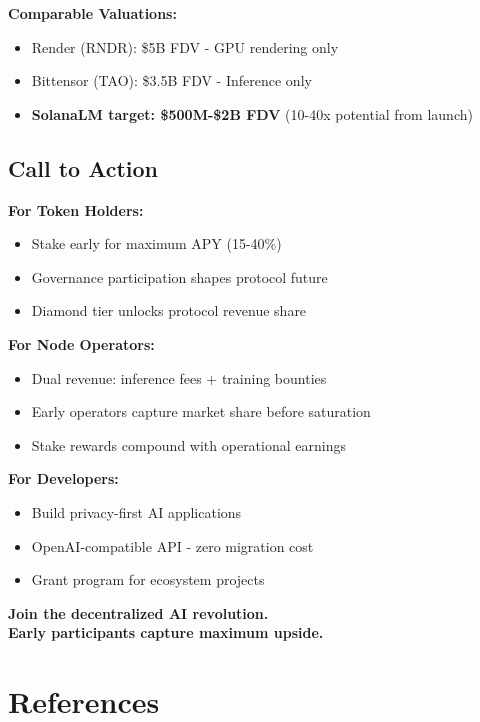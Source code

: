 \documentclass[11pt,a4paper]{article}
\begin{document}
\textbf{Comparable Valuations:}
\begin{itemize}
    \item Render (RNDR): \$5B FDV - GPU rendering only
    \item Bittensor (TAO): \$3.5B FDV - Inference only
    \item \textbf{SolanaLM target: \$500M-\$2B FDV} (10-40x potential from launch)
\end{itemize}

\subsection{Call to Action}

\textbf{For Token Holders:}
\begin{itemize}
    \item Stake early for maximum APY (15-40\%)
    \item Governance participation shapes protocol future
    \item Diamond tier unlocks protocol revenue share
\end{itemize}

\textbf{For Node Operators:}
\begin{itemize}
    \item Dual revenue: inference fees + training bounties
    \item Early operators capture market share before saturation
    \item Stake rewards compound with operational earnings
\end{itemize}

\textbf{For Developers:}
\begin{itemize}
    \item Build privacy-first AI applications
    \item OpenAI-compatible API - zero migration cost
    \item Grant program for ecosystem projects
\end{itemize}

\vspace{0.5cm}
\begin{center}
\textbf{\large Join the decentralized AI revolution.}\\[0.3cm]
\textbf{\Large Early participants capture maximum upside.}
\end{center}

\section*{References}
\end{document}
